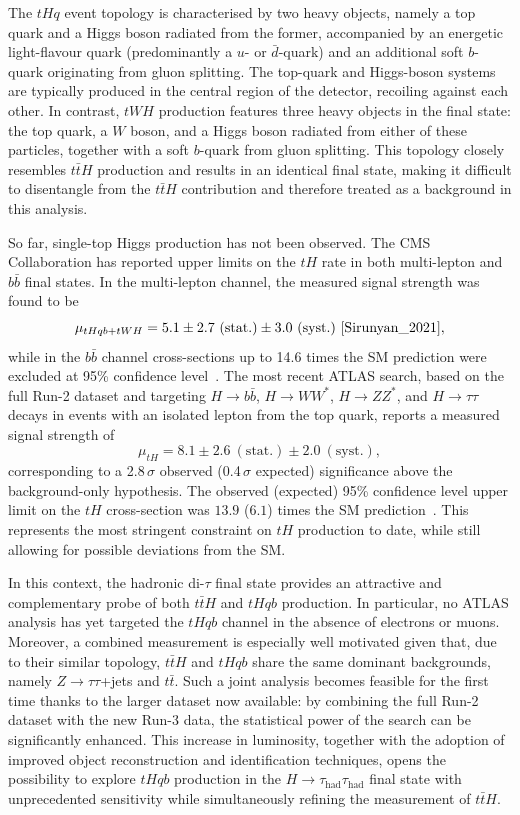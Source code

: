   The $tHq$ event topology is characterised by two heavy objects, namely a top quark and a Higgs boson radiated from the former, accompanied by an energetic light-flavour quark (predominantly a $u$- or $\bar{d}$-quark) and an additional soft $b$-quark originating from gluon splitting. 
  The top-quark and Higgs-boson systems are typically produced in the central region of the detector, recoiling against each other. 
  In contrast, $tWH$ production features three heavy objects in the final state: the top quark, a $W$ boson, and a Higgs boson radiated from either of these particles, together with a soft $b$-quark from gluon splitting. 
  This topology closely resembles $t\bar{t}H$ production and results in an identical final state, making it difficult to disentangle from the $t\bar{t}H$ contribution and therefore treated as a background in this analysis. 
  
  So far, single-top Higgs production has not been observed. 
  The CMS Collaboration has reported upper limits on the $tH$ rate in both multi-lepton and $b\bar{b}$ final states. 
  In the multi-lepton channel, the measured signal strength was found to be 
  \[
  \mu_{tHqb+tWH} = 5.1 \pm 2.7~(\text{stat.}) \pm 3.0~(\text{syst.})~\cite{Sirunyan_2021},
  \] 
  while in the $b\bar{b}$ channel cross-sections up to 14.6 times the SM prediction were excluded at 95\% confidence level~\cite{2025}. 
  The most recent ATLAS search, based on the full Run-2 dataset and targeting $H\to b\bar{b}$, $H\to WW^*$, $H\to ZZ^*$, and $H\to\tau\tau$ decays in events with an isolated lepton from the top quark, reports a measured signal strength of
  \[
  \mu_{tH} = 8.1 \pm 2.6~(\text{stat.}) \pm 2.0~(\text{syst.}),
  \] 
  corresponding to a 2.8\,$\sigma$ observed (0.4\,$\sigma$ expected) significance above the background-only hypothesis. 
  The observed (expected) 95\% confidence level upper limit on the $tH$ cross-section was $13.9$ ($6.1$) times the SM prediction~\cite{ATLAS:2025irr}. 
  This represents the most stringent constraint on $tH$ production to date, while still allowing for possible deviations from the SM. 
  
  In this context, the hadronic di-$\tau$ final state provides an attractive and complementary probe of both $t\bar{t}H$ and $tHqb$ production. 
  In particular, no ATLAS analysis has yet targeted the $tHqb$ channel in the absence of electrons or muons. 
  Moreover, a combined measurement is especially well motivated given that, due to their similar topology, $t\bar{t}H$ and $tHqb$ share the same dominant backgrounds, namely $Z\to\tau\tau$+jets and $t\bar{t}$. 
  Such a joint analysis becomes feasible for the first time thanks to the larger dataset now available: by combining the full Run-2 dataset with the new Run-3 data, the statistical power of the search can be significantly enhanced. 
  This increase in luminosity, together with the adoption of improved object reconstruction and identification techniques, opens the possibility to explore $tHqb$ production in the $H\to\tau_{\mathrm{had}}\tau_{\mathrm{had}}$ final state with unprecedented sensitivity while simultaneously refining the measurement of $t\bar{t}H$.
  




